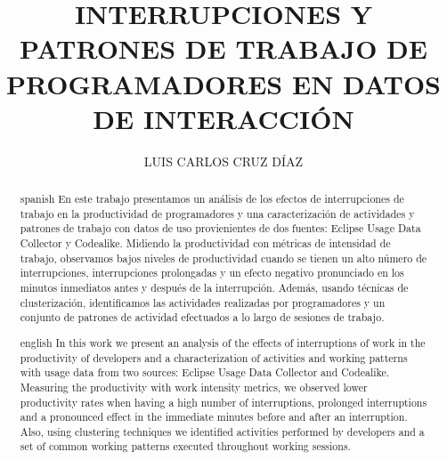\documentclass{tesisITAM}
\title{INTERRUPCIONES Y PATRONES DE TRABAJO DE PROGRAMADORES EN DATOS DE INTERACCIÓN}
\author{LUIS CARLOS CRUZ DÍAZ}
\begin{document}
	 {
		
		\newcommand{\changedforreviewer}[1]{\textcolor{blue}{#1}}
		
		
		
		\newenvironment{changedforreviewerlong}
			{\begin{color}{blue}}
			{\end{color}}
		
	}{
	
		\newcommand{\changedforreviewer}[1]{#1}
		
		
		
		\newenvironment{changedforreviewerlong}%
		
		{}
		
		{}
		
	}

	
	\maketitle
	\publicationrights
	
	\large

	
	\begin{abstract}{spanish}
		En este trabajo presentamos un análisis de los efectos de interrupciones de trabajo en la productividad de programadores y una caracterización de actividades y patrones de trabajo con datos de uso provienientes de dos fuentes: Eclipse Usage Data Collector y Codealike. Midiendo la productividad con métricas de intensidad de trabajo, observamos bajos niveles de productividad cuando se tienen un alto número de interrupciones, interrupciones prolongadas y un efecto negativo pronunciado en los minutos inmediatos antes y después de la interrupción. Además, usando técnicas de clusterización, identificamos las actividades realizadas por programadores y un conjunto de patrones de actividad efectuados a lo largo de sesiones de trabajo.
	\end{abstract}

	\begin{abstract}{english}
		In this work we present an analysis of the effects of interruptions of work in the productivity of developers and a characterization of activities and working patterns with usage data from two sources: Eclipse Usage Data Collector and Codealike. Measuring the productivity with work intensity metrics, we observed lower productivity rates when having a high number of interruptions, prolonged interruptions and a pronounced effect in the immediate minutes before and after an interruption. Also, using clustering techniques we identified activities performed by developers and a set of common working patterns executed throughout working sessions.
	\end{abstract}
\end{document}
